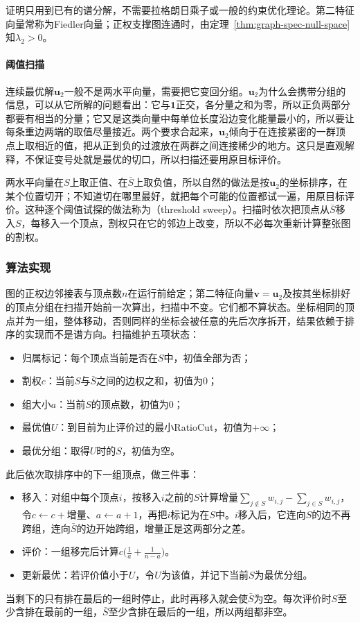 证明只用到已有的谱分解，不需要拉格朗日乘子或一般的约束优化理论。第二特征向量常称为Fiedler向量；正权支撑图连通时，由定理~\ref{thm:graph-spec-null-space}知$\lambda_2>0$。

\paragraph{阈值扫描}
连续最优解$\bm u_2$一般不是两水平向量，需要把它变回分组。$\bm u_2$为什么会携带分组的信息，可以从它所解的问题看出：它与$\bm1$正交，各分量之和为零，所以正负两部分都要有相当的分量；它又是这类向量中每单位长度沿边变化能量最小的，所以要让每条重边两端的取值尽量接近。两个要求合起来，$\bm u_2$倾向于在连接紧密的一群顶点上取相近的值，把从正到负的过渡放在两群之间连接稀少的地方。这只是直观解释，不保证变号处就是最优的切口，所以扫描还要用原目标评价。

两水平向量在$S$上取正值、在$\bar S$上取负值，所以自然的做法是按$\bm u_2$的坐标排序，在某个位置切开；不知道切在哪里最好，就把每个可能的位置都试一遍，用原目标评价。这种逐个阈值试探的做法称为（threshold sweep）。扫描时依次把顶点从$\bar S$移入$S$，每移入一个顶点，割权只在它的邻边上改变，所以不必每次重新计算整张图的割权。

\subsubsection{算法实现}

图的正权边邻接表与顶点数$n$在运行前给定；第二特征向量$\bm v=\bm u_2$及按其坐标排好的顶点分组在扫描开始前一次算出，扫描中不变。它们都不算状态。坐标相同的顶点并为一组，整体移动，否则同样的坐标会被任意的先后次序拆开，结果依赖于排序的实现而不是谱方向。扫描维护五项状态：
\begin{itemize}
  \item 归属标记：每个顶点当前是否在$S$中，初值全部为否；
  \item 割权$c$：当前$S$与$\bar S$之间的边权之和，初值为$0$；
  \item 组大小$a$：当前$S$的顶点数，初值为$0$；
  \item 最优值$U$：到目前为止评价过的最小RatioCut，初值为$+\infty$；
  \item 最优分组：取得$U$时的$S$，初值为空。
\end{itemize}
此后依次取排序中的下一组顶点，做三件事：
\begin{itemize}
  \item 移入：对组中每个顶点$i$，按移入$i$之前的$S$计算增量$\sum_{j\notin S}w_{i,j}-\sum_{j\in S}w_{i,j}$，令$c\gets c+\text{增量}$、$a\gets a+1$，再把$i$标记为在$S$中。$i$移入后，它连向$S$的边不再跨组，连向$\bar S$的边开始跨组，增量正是这两部分之差。
  \item 评价：一组移完后计算$c\bigl(\tfrac1a+\tfrac1{n-a}\bigr)$。
  \item 更新最优：若评价值小于$U$，令$U$为该值，并记下当前$S$为最优分组。
\end{itemize}
当剩下的只有排在最后的一组时停止，此时再移入就会使$\bar S$为空。每次评价时$S$至少含排在最前的一组，$\bar S$至少含排在最后的一组，所以两组都非空。

